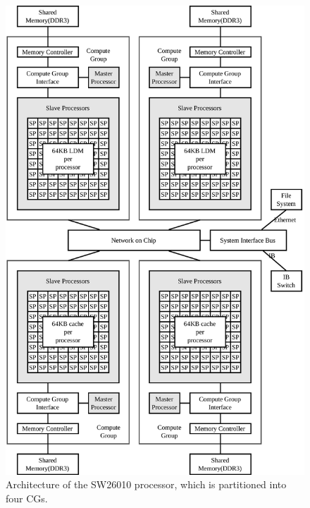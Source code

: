 \begin{figure}[!htb]
  \begin{center}
    \includegraphics[width=\linewidth]{figures/SW26010}
    \caption{Architecture of the SW26010 processor, which is
      partitioned into four CGs.}
    \label{fig:SW26010}
  \end{center}
\end{figure}

